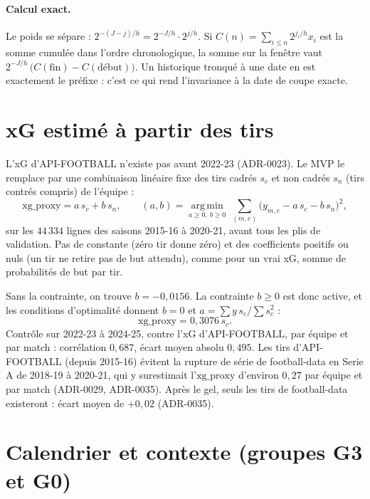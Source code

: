 \paragraph{Calcul exact.} Le poids se sépare : \(2^{-(J - j)/h} = 2^{-J/h} \cdot 2^{j/h}\). Si
\(C(n) = \sum_{i \le n} 2^{j_i/h} x_i\) est la somme cumulée dans l'ordre chronologique, la somme
sur la fenêtre vaut \(2^{-J/h}\,\big(C(\text{fin}) - C(\text{début})\big)\). Un historique tronqué
à une date en est exactement le préfixe : c'est ce qui rend l'invariance à la date de coupe exacte.

\section{xG estimé à partir des tirs}
\label{sec:xgproxy}

L'xG d'API-FOOTBALL n'existe pas avant 2022-23 (ADR-0023). Le MVP le remplace par une combinaison
linéaire fixe des tirs cadrés \(s_c\) et non cadrés \(s_n\) (tirs contrés compris) de l'équipe :
\[
  \mathrm{xg\_proxy} = a\, s_c + b\, s_n,
  \qquad
  (a, b) = \operatorname*{arg\,min}_{a \ge 0,\ b \ge 0}\ \sum_{(m,e)} \big(y_{m,e} - a\, s_{c} - b\, s_{n}\big)^2,
\]
sur les \(44\,334\) lignes des saisons 2015-16 à 2020-21, avant tous les plis de validation. Pas de
constante (zéro tir donne zéro) et des coefficients positifs ou nuls (un tir ne retire pas de but
attendu), comme pour un vrai xG, somme de probabilités de but par tir.

Sans la contrainte, on trouve \(b = -0{,}0156\). La contrainte \(b \ge 0\) est donc active, et les
conditions d'optimalité donnent \(b = 0\) et \(a = \sum y\, s_c / \sum s_c^2\) :
\[
  \mathrm{xg\_proxy} = 0{,}3076\, s_c.
\]
Contrôle sur 2022-23 à 2024-25, contre l'xG d'API-FOOTBALL, par équipe et par match : corrélation
\(0{,}687\), écart moyen absolu \(0{,}495\). Les tirs d'API-FOOTBALL (depuis 2015-16) évitent la
rupture de série de football-data en Serie A de 2018-19 à 2020-21, qui y surestimait
l'\(\mathrm{xg\_proxy}\) d'environ \(0{,}27\) par équipe et par match (ADR-0029, ADR-0035). Après le
gel, seuls les tirs de football-data existeront : écart moyen de \(+0{,}02\) (ADR-0035).

\section{Calendrier et contexte (groupes G3 et G0)}
\label{sec:calendrier}

